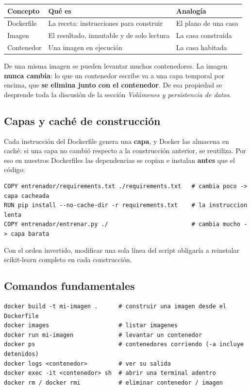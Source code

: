 \documentclass[12pt,a4paper]{article}
\begin{document}
\begin{center}
\begin{tabular}{|l|l|l|}
\hline
\textbf{Concepto} & \textbf{Qu\'e es} & \textbf{Analog\'ia} \\
\hline
Dockerfile & La receta: instrucciones para construir & El plano de una casa \\
Imagen & El resultado, inmutable y de solo lectura & La casa construida \\
Contenedor & Una imagen en ejecuci\'on & La casa habitada \\
\hline
\end{tabular}
\end{center}

De una misma imagen se pueden levantar muchos contenedores. La imagen \textbf{nunca cambia}: lo
que un contenedor escribe va a una capa temporal por encima, que \textbf{se elimina junto con el
contenedor}. De esa propiedad se desprende toda la discusi\'on de la secci\'on
\emph{Vol\'umenes y persistencia de datos}.

\subsection{Capas y cach\'e de construcci\'on}

Cada instrucci\'on del Dockerfile genera una \textbf{capa}, y Docker las almacena en cach\'e: si
una capa no cambi\'o respecto a la construcci\'on anterior, se reutiliza. Por eso en nuestros
Dockerfiles las dependencias se copian e instalan \textbf{antes} que el c\'odigo:

\begin{verbatim}
COPY entrenador/requirements.txt ./requirements.txt   # cambia poco -> capa cacheada
RUN pip install --no-cache-dir -r requirements.txt    # la instruccion lenta
COPY entrenador/entrenar.py ./                        # cambia mucho -> capa barata
\end{verbatim}

Con el orden invertido, modificar una sola l\'inea del script obligar\'ia a reinstalar
scikit-learn completo en cada construcci\'on.

\subsection{Comandos fundamentales}

\begin{verbatim}
docker build -t mi-imagen .      # construir una imagen desde el Dockerfile
docker images                    # listar imagenes
docker run mi-imagen             # levantar un contenedor
docker ps                        # contenedores corriendo (-a incluye detenidos)
docker logs <contenedor>         # ver su salida
docker exec -it <contenedor> sh  # abrir una terminal adentro
docker rm / docker rmi           # eliminar contenedor / imagen
\end{verbatim}
\end{document}
